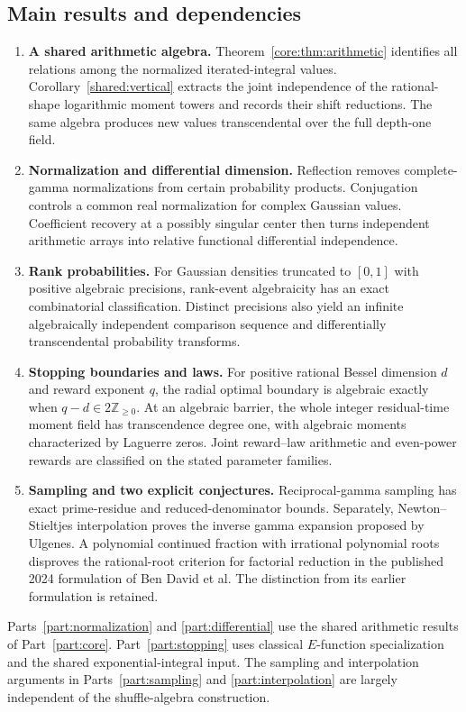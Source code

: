\documentclass[11pt,a4paper]{article}
\theoremstyle{definition}
\theoremstyle{remark}
\numberwithin{equation}{section}
\begin{document}
\subsection{Main results and dependencies}
\begin{enumerate}
\item \textbf{A shared arithmetic algebra.}
Theorem~\ref{core:thm:arithmetic} identifies all relations among the
normalized iterated-integral values. Corollary~\ref{shared:vertical}
extracts the joint independence of the rational-shape logarithmic
moment towers and records their shift reductions. The same algebra
produces new values transcendental over the full depth-one field.
\item \textbf{Normalization and differential dimension.}
Reflection removes complete-gamma normalizations from certain
probability products. Conjugation controls a common real normalization
for complex Gaussian values. Coefficient recovery at a possibly
singular center then turns independent arithmetic arrays into relative
functional differential independence.
\item \textbf{Rank probabilities.}
For Gaussian densities truncated to $[0,1]$ with positive algebraic
precisions, rank-event algebraicity has an exact combinatorial
classification. Distinct precisions also yield an infinite
algebraically independent comparison sequence and differentially
transcendental probability transforms.
\item \textbf{Stopping boundaries and laws.}
For positive rational Bessel dimension $d$ and reward exponent $q$,
the radial optimal boundary is algebraic exactly when
$q-d\in2\mathbb Z_{\ge0}$. At an algebraic barrier, the whole
integer residual-time moment field has transcendence degree one,
with algebraic moments characterized by Laguerre zeros. Joint
reward--law arithmetic and even-power rewards are classified on
the stated parameter families.
\item \textbf{Sampling and two explicit conjectures.}
Reciprocal-gamma sampling has exact prime-residue and reduced-denominator
bounds. Separately, Newton--Stieltjes interpolation proves the inverse
gamma expansion proposed by Ulgenes. A polynomial continued fraction
with irrational polynomial roots disproves the rational-root criterion
for factorial reduction in the published 2024 formulation of Ben David
et al. The distinction from its earlier formulation is retained.
\end{enumerate}

Parts~\ref{part:normalization} and \ref{part:differential} use the
shared arithmetic results of Part~\ref{part:core}.
Part~\ref{part:stopping} uses classical $E$-function specialization
and the shared exponential-integral input. The sampling and interpolation
arguments in Parts~\ref{part:sampling} and \ref{part:interpolation}
are largely independent of the shuffle-algebra construction.
\end{document}
